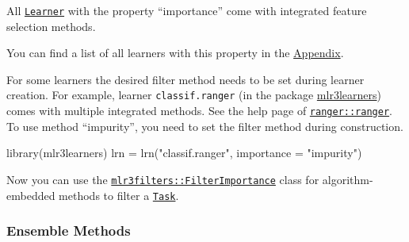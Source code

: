 \documentclass[]{article}
\newenvironment{Shaded}{}{}
\newcommand{\DataTypeTok}[1]{#1}
\newcommand{\DecValTok}[1]{#1}
\newcommand{\KeywordTok}[1]{\textcolor[rgb]{0.00,0.00,1.00}{#1}}
\newcommand{\NormalTok}[1]{#1}
\newcommand{\OperatorTok}[1]{#1}
\newcommand{\StringTok}[1]{\textcolor[rgb]{0.00,0.50,0.50}{#1}}
\renewenvironment{Shaded} {\begin{snugshade}\small} {\end{snugshade}}
\begin{document}
All \href{https://mlr3.mlr-org.com/reference/Learner.html}{\texttt{Learner}} with the property ``importance'' come with integrated feature selection methods.

You can find a list of all learners with this property in the \protect\hyperlink{fs-filter-embedded-list}{Appendix}.

For some learners the desired filter method needs to be set during learner creation.
For example, learner \texttt{classif.ranger} (in the package \href{https://mlr3learners.mlr-org.com}{mlr3learners}) comes with multiple integrated methods.
See the help page of \href{https://www.rdocumentation.org/packages/ranger/topics/ranger}{\texttt{ranger::ranger}}.
To use method ``impurity'', you need to set the filter method during construction.

\begin{Shaded}
\begin{Highlighting}[]
\KeywordTok{library}\NormalTok{(mlr3learners)}
\NormalTok{lrn =}\StringTok{ }\KeywordTok{lrn}\NormalTok{(}\StringTok{"classif.ranger"}\NormalTok{, }\DataTypeTok{importance =} \StringTok{"impurity"}\NormalTok{)}
\end{Highlighting}
\end{Shaded}

Now you can use the \href{https://mlr3filters.mlr-org.com/reference/FilterImportance.html}{\texttt{mlr3filters::FilterImportance}} class for algorithm-embedded methods to filter a \href{https://mlr3.mlr-org.com/reference/Task.html}{\texttt{Task}}.

\begin{Shaded}
\end{Shaded}

\hypertarget{fs-ensemble}{%
\subsubsection{Ensemble Methods}\label{fs-ensemble}}
\end{document}
